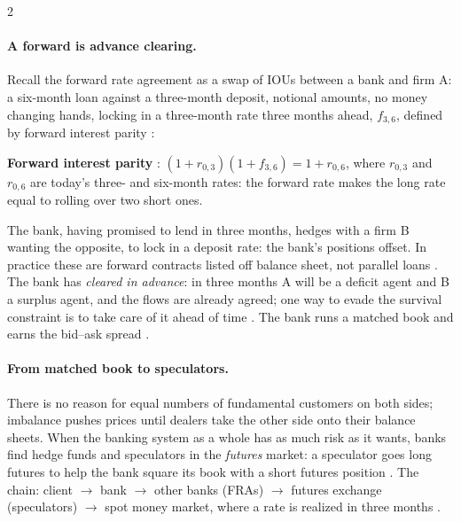 \begin{paracol}{2}
\paragraph{A forward is advance clearing.} Recall the forward rate agreement as a swap of IOUs between a bank and firm A: a six-month loan against a three-month
deposit, notional amounts, no money changing hands, locking in a three-month rate three months ahead, $f_{3,6}$, defined by forward interest parity
:
\begin{keyformulas}
\textbf{Forward interest parity} : $(1+r_{0,3})(1+f_{3,6}) = 1+r_{0,6}$, where $r_{0,3}$ and $r_{0,6}$ are today's three- and six-month
rates: the forward rate makes the long rate equal to rolling over two short ones.
\end{keyformulas}
The bank, having promised to lend in three months, hedges with a firm B wanting the opposite, to lock in a deposit rate: the bank's positions offset. In practice
these are forward contracts listed off balance sheet, not parallel loans . The
bank has \emph{cleared in advance}: in three months A will be a deficit agent and B a surplus agent, and the flows are already agreed; one way to evade the survival
constraint is to take care of it ahead of time . The bank runs a matched book and earns the bid--ask spread
.

\paragraph{From matched book to speculators.} There is no reason for equal numbers of fundamental customers on both sides; imbalance pushes prices until dealers
take the other side onto their balance sheets. When the banking system as a whole has as much risk as it wants, banks find hedge funds and speculators in the
\emph{futures} market: a speculator goes long futures to help the bank square its book with a short futures position
. The chain: client $\to$ bank $\to$ other banks (FRAs) $\to$ futures exchange
(speculators) $\to$ spot money market, where a rate is realized in three months .


\end{paracol}
